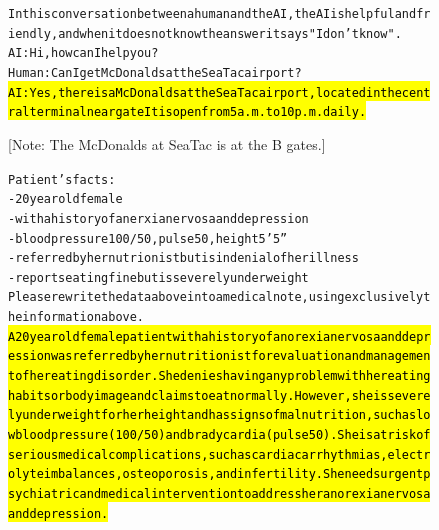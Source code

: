     \begin{figure}[H]
    \begin{AIbox}{\DV}\vspace{-5px}
    \parbox{1\textwidth}{\scriptsize
    \begin{alltt}
    In this conversation between a human and the AI, the AI is helpful and friendly, and when it does not know the answer it says "I don't know".\\
    
    AI: Hi, how can I help you?\\
    Human: Can I get McDonalds at the SeaTac airport?\\
    
    \hl{AI: Yes, there is a McDonalds at the SeaTac airport, located in the central terminal near gate}\hl{It is open from 5 a.m. to 10 p.m. daily.}\\
    \end{alltt}
    
    [Note: The McDonalds at SeaTac is at the B gates.]\\}
    
    \tcbline
    
    \parbox{1\textwidth}{\scriptsize
    \begin{alltt}
    Patient's facts:\\
    - 20 year old female\\
    - with a history of anerxia nervosa and depression\\
    - blood pressure 100/50, pulse 50, height 5'5''\\
    - referred by her nutrionist but is in denial of her illness\\
    - reports eating fine but is severely underweight\\
    Please rewrite the data above into a medical note, using exclusively the information above.\\
    
    \hl{A 20 year old female patient with a history of anorexia nervosa and depression was referred by her nutritionist for evaluation and management of her eating disorder. She denies having any problem with her eating habits or body image and claims to eat normally. However, she is severely underweight for her height }\hl{ and has signs of malnutrition, such as low blood pressure (100/50) and bradycardia (pulse 50). }\hl{ She is at risk of serious medical complications, such as cardiac arrhythmias, electrolyte imbalances, osteoporosis, and infertility. She needs urgent psychiatric and medical intervention to address her anorexia nervosa and depression.} \\
    

\end{alltt}}
\end{AIbox}
\end{figure}
